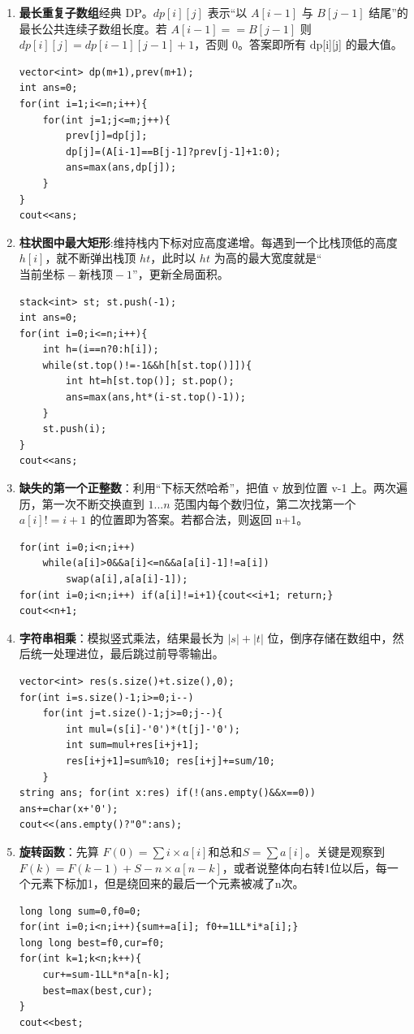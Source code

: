 \documentclass{article}
\begin{document}
\begin{enumerate}[label=\textbf{H\arabic*.}]
  \item \textbf{最长重复子数组}经典 DP。$dp[i][j]$ 表示“以 $A[i-1]$ 与 $B[j-1]$ 结尾”的最长公共连续子数组长度。若 $A[i-1]==B[j-1]$ 则 $dp[i][j]=dp[i-1][j-1]+1$，否则 0。答案即所有 dp[i][j] 的最大值。
\begin{lstlisting}
vector<int> dp(m+1),prev(m+1);
int ans=0;
for(int i=1;i<=n;i++){
    for(int j=1;j<=m;j++){
        prev[j]=dp[j];
        dp[j]=(A[i-1]==B[j-1]?prev[j-1]+1:0);
        ans=max(ans,dp[j]);
    }
}
cout<<ans;
\end{lstlisting}

  \item \textbf{柱状图中最大矩形}:维持栈内下标对应高度递增。每遇到一个比栈顶低的高度 $h[i]$，就不断弹出栈顶 $ht$，此时以 $ht$ 为高的最大宽度就是“$\text{当前坐标} - \text{新栈顶} - 1$”，更新全局面积。
\begin{lstlisting}
stack<int> st; st.push(-1);
int ans=0;
for(int i=0;i<=n;i++){
    int h=(i==n?0:h[i]);
    while(st.top()!=-1&&h[h[st.top()]]){
        int ht=h[st.top()]; st.pop();
        ans=max(ans,ht*(i-st.top()-1));
    }
    st.push(i);
}
cout<<ans;
\end{lstlisting}

  \item \textbf{缺失的第一个正整数}：利用“下标天然哈希”，把值 v 放到位置 v-1 上。两次遍历，第一次不断交换直到 $1...n$ 范围内每个数归位，第二次找第一个 $a[i]!=i+1$ 的位置即为答案。若都合法，则返回 n+1。
\begin{lstlisting}
for(int i=0;i<n;i++)
    while(a[i]>0&&a[i]<=n&&a[a[i]-1]!=a[i])
        swap(a[i],a[a[i]-1]);
for(int i=0;i<n;i++) if(a[i]!=i+1){cout<<i+1; return;}
cout<<n+1;
\end{lstlisting}

  \item \textbf{字符串相乘}：模拟竖式乘法，结果最长为 $|s|+|t|$ 位，倒序存储在数组中，然后统一处理进位，最后跳过前导零输出。
\begin{lstlisting}
vector<int> res(s.size()+t.size(),0);
for(int i=s.size()-1;i>=0;i--)
    for(int j=t.size()-1;j>=0;j--){
        int mul=(s[i]-'0')*(t[j]-'0');
        int sum=mul+res[i+j+1];
        res[i+j+1]=sum%10; res[i+j]+=sum/10;
    }
string ans; for(int x:res) if(!(ans.empty()&&x==0)) ans+=char(x+'0');
cout<<(ans.empty()?"0":ans);
\end{lstlisting}

  \item \textbf{旋转函数}：先算 $F(0)=\sum i \times a[i]$和总和$S =\sum a[i]$。关键是观察到 $F(k)=F(k-1)+S-n\times a[n-k]$，或者说整体向右转1位以后，每一个元素下标加1，但是绕回来的最后一个元素被减了n次。
\begin{lstlisting}
long long sum=0,f0=0;
for(int i=0;i<n;i++){sum+=a[i]; f0+=1LL*i*a[i];}
long long best=f0,cur=f0;
for(int k=1;k<n;k++){
    cur+=sum-1LL*n*a[n-k];
    best=max(best,cur);
}
cout<<best;
\end{lstlisting}
\end{enumerate}
\end{document}
